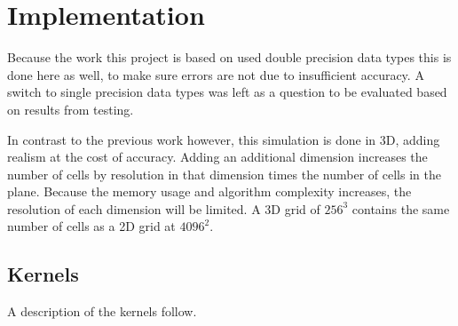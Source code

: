 \chapter{Implementation}
Because the work this project is based on used double precision data types this is done here as well, to make sure
errors are not due to insufficient accuracy. A switch to single precision data types was left as a question to be
evaluated based on results from testing.

In contrast to the previous work however, this simulation is done in 3D, adding realism at the cost of accuracy. Adding
an additional dimension increases the number of cells by resolution in that dimension times the number of cells in the
plane. Because the memory usage and algorithm complexity increases, the resolution of each dimension will be limited.
A 3D grid of $256^3$ contains the same number of cells as a 2D grid at $4096^2$.

\section{Kernels}
A description of the kernels follow.

